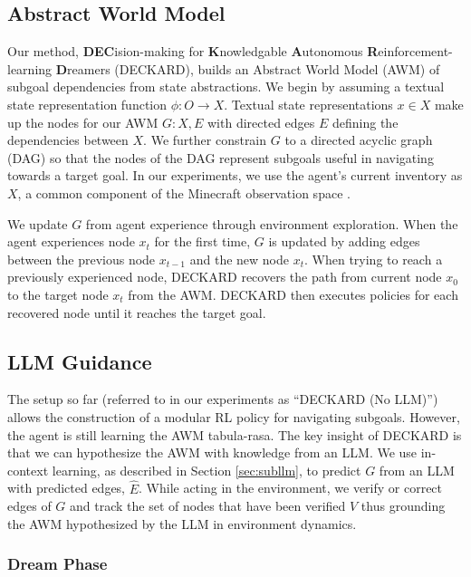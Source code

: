 \documentclass[nohyperref]{article}
\theoremstyle{plain}
\theoremstyle{definition}
\theoremstyle{remark}
\newcommand{\agentshort}{\textsc{DECKARD}}
\newcommand{\agentlong}{\textbf{DEC}ision-making for \textbf{K}nowledgable \textbf{A}utonomous \textbf{R}einforcement-learning \textbf{D}reamers}
\begin{document}
\subsection{Abstract World Model}

Our method, \agentlong{} (\agentshort), builds an Abstract World Model (AWM) of subgoal dependencies from state abstractions.
We begin by assuming a textual state representation function $\phi: O \to X$. 
Textual state representations $x \in X$ make up the nodes for our AWM $G: X, E$ with directed edges $E$ defining the dependencies between $X$. 
We further constrain $G$ to a directed acyclic graph (DAG) so that the nodes of the DAG represent subgoals useful in navigating towards a target goal. 
In our experiments, we use the agent's current inventory as $X$, a common component of the Minecraft observation space \cite{fanminedojo,danijardreamer}.

We update $G$ from agent experience through environment exploration. 
When the agent experiences node $x_t$ for the first time, $G$ is updated by adding edges between the previous node $x_{t-1}$ and the new node $x_t$.
When trying to reach a previously experienced node, \agentshort{} recovers the path from current node $x_0$ to the target node $x_t$ from the AWM.
\agentshort{} then executes policies for each recovered node until it reaches the target goal.

\subsection{LLM Guidance}

The setup so far (referred to in our experiments as ``\agentshort{} (No LLM)'') allows the construction of a modular RL policy for navigating subgoals.
However, the agent is still learning the AWM tabula-rasa.
The key insight of \agentshort{} is that we can hypothesize the AWM with knowledge from an LLM.
We use in-context learning, as described in Section \ref{sec:subllm}, to predict $G$ from an LLM with predicted edges, $\hat{E}$.
While acting in the environment, we verify or correct edges of $G$ and track the set of nodes that have been verified $V$ thus grounding the AWM hypothesized by the LLM in environment dynamics. 

\subsubsection{Dream Phase}
\label{sec:dream}
\end{document}
